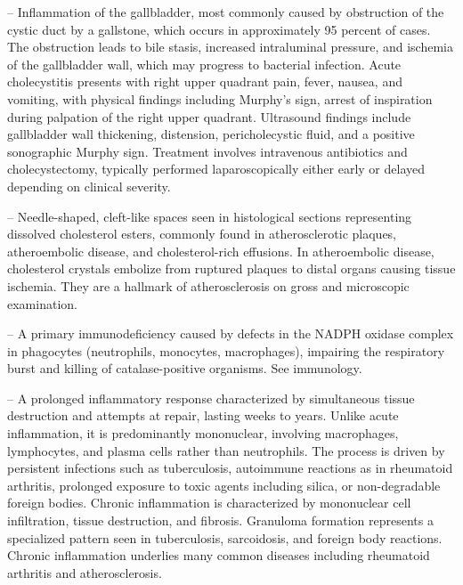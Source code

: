 -- Inflammation of the gallbladder, most commonly caused by obstruction of the cystic duct by a gallstone, which occurs in approximately 95 percent of cases. The obstruction leads to bile stasis, increased intraluminal pressure, and ischemia of the gallbladder wall, which may progress to bacterial infection. Acute cholecystitis presents with right upper quadrant pain, fever, nausea, and vomiting, with physical findings including Murphy's sign, arrest of inspiration during palpation of the right upper quadrant. Ultrasound findings include gallbladder wall thickening, distension, pericholecystic fluid, and a positive sonographic Murphy sign. Treatment involves intravenous antibiotics and cholecystectomy, typically performed laparoscopically either early or delayed depending on clinical severity.

-- Needle-shaped, cleft-like spaces seen in histological sections representing dissolved cholesterol esters, commonly found in atherosclerotic plaques, atheroembolic disease, and cholesterol-rich effusions. In atheroembolic disease, cholesterol crystals embolize from ruptured plaques to distal organs causing tissue ischemia. They are a hallmark of atherosclerosis on gross and microscopic examination.

-- A primary immunodeficiency caused by defects in the NADPH oxidase complex in phagocytes (neutrophils, monocytes, macrophages), impairing the respiratory burst and killing of catalase-positive organisms. See immunology.

-- A prolonged inflammatory response characterized by simultaneous tissue destruction and attempts at repair, lasting weeks to years. Unlike acute inflammation, it is predominantly mononuclear, involving macrophages, lymphocytes, and plasma cells rather than neutrophils. The process is driven by persistent infections such as tuberculosis, autoimmune reactions as in rheumatoid arthritis, prolonged exposure to toxic agents including silica, or non-degradable foreign bodies. Chronic inflammation is characterized by mononuclear cell infiltration, tissue destruction, and fibrosis. Granuloma formation represents a specialized pattern seen in tuberculosis, sarcoidosis, and foreign body reactions. Chronic inflammation underlies many common diseases including rheumatoid arthritis and atherosclerosis.

